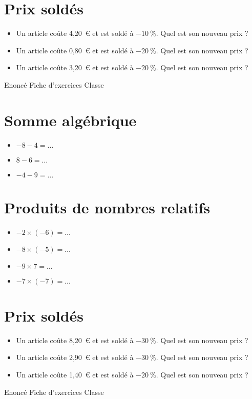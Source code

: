 \documentclass[a4paper,11pt,fleqn]{article}
\begin{document}
\section{Prix soldés}
\begin{itemize}

  \item Un article coûte 4,20~€ et est soldé à $-10~\%$. Quel est son nouveau prix ?
  \item Un article coûte 0,80~€ et est soldé à $-20~\%$. Quel est son nouveau prix ?
  \item Un article coûte 3,20~€ et est soldé à $-20~\%$. Quel est son nouveau prix ?
\end{itemize}
\newpage
\setcounter{exo}{0}
\setcounter{section}{0}
{Enoncé} \hfill {\huge Fiche d'exercices } \hfill {Classe}

\section{Somme algébrique}
\begin{itemize}

  \item $-8 -4=\ldots$
  \item $8 -6=\ldots$
  \item $-4 -9=\ldots$
\end{itemize}


\section{Produits de nombres relatifs}
\begin{itemize}

  \item $-2\times(-6)=\ldots$
  \item $-8\times(-5)=\ldots$
  \item $-9\times7=\ldots$
  \item $-7\times(-7)=\ldots$
\end{itemize}


\section{Prix soldés}
\begin{itemize}

  \item Un article coûte 8,20~€ et est soldé à $-30~\%$. Quel est son nouveau prix ?
  \item Un article coûte 2,90~€ et est soldé à $-30~\%$. Quel est son nouveau prix ?
  \item Un article coûte 1,40~€ et est soldé à $-20~\%$. Quel est son nouveau prix ?
\end{itemize}
\newpage
\setcounter{exo}{0}
\setcounter{section}{0}
{Enoncé} \hfill {\huge Fiche d'exercices } \hfill {Classe}
\end{document}
